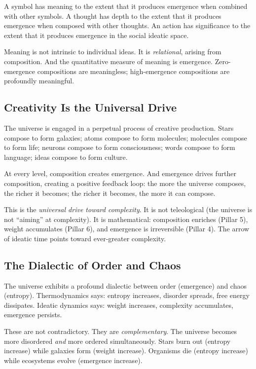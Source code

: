 A symbol has meaning to the extent that it produces emergence when combined
with other symbols. A thought has depth to the extent that it produces
emergence when composed with other thoughts. An action has significance to
the extent that it produces emergence in the social ideatic space.

Meaning is not intrinsic to individual ideas. It is \emph{relational}, arising
from composition. And the quantitative measure of meaning is emergence. Zero-emergence
compositions are meaningless; high-emergence compositions are profoundly
meaningful.

\subsection{Creativity Is the Universal Drive}

The universe is engaged in a perpetual process of creative production. Stars
compose to form galaxies; atoms compose to form molecules; molecules compose
to form life; neurons compose to form consciousness; words compose to form
language; ideas compose to form culture.

At every level, composition creates emergence. And emergence drives further
composition, creating a positive feedback loop: the more the universe composes,
the richer it becomes; the richer it becomes, the more it can compose.

This is the \emph{universal drive toward complexity}. It is not teleological
(the universe is not ``aiming'' at complexity). It is mathematical: composition
enriches (Pillar 5), weight accumulates (Pillar 6), and emergence is irreversible
(Pillar 4). The arrow of ideatic time points toward ever-greater complexity.

\subsection{The Dialectic of Order and Chaos}

The universe exhibits a profound dialectic between order (emergence) and chaos
(entropy). Thermodynamics says: entropy increases, disorder spreads, free
energy dissipates. Ideatic dynamics says: weight increases, complexity
accumulates, emergence persists.

These are not contradictory. They are \emph{complementary}. The universe
becomes more disordered \emph{and} more ordered simultaneously. Stars burn
out (entropy increase) while galaxies form (weight increase). Organisms die
(entropy increase) while ecosystems evolve (emergence increase).

